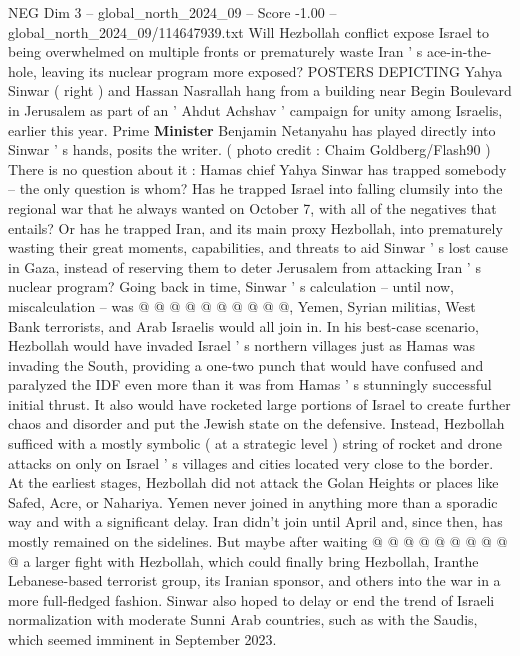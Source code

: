 \begin{textsample}{NEG Dim 3 – global\_north\_2024\_09 – Score -1.00 – global\_north\_2024\_09/114647939.txt}  \label{ex:f3_neg_299}
Will Hezbollah conflict expose Israel to being overwhelmed on multiple fronts or prematurely waste Iran ' s ace-in-the-hole, leaving its nuclear program more exposed?
POSTERS DEPICTING Yahya Sinwar ( right ) and Hassan Nasrallah hang from a building near Begin Boulevard in Jerusalem as part of an ' Ahdut Achshav ' campaign for unity among Israelis, earlier this year.
Prime \textbf{Minister} Benjamin Netanyahu has played directly into Sinwar ' s hands, posits the writer. ( photo credit : Chaim Goldberg/Flash90 ) There is no question about it : Hamas chief Yahya Sinwar has trapped somebody -- the only question is whom?
Has he trapped Israel into falling clumsily into the regional war that he always wanted on October 7, with all of the negatives that entails?
Or has he trapped Iran, and its main proxy Hezbollah, into prematurely wasting their great moments, capabilities, and threats to aid Sinwar ' s lost cause in Gaza, instead of reserving them to deter Jerusalem from attacking Iran ' s nuclear program?
Going back in time, Sinwar ' s calculation -- until now, miscalculation -- was @ @ @ @ @ @ @ @ @ @, Yemen, Syrian militias, West Bank terrorists, and Arab Israelis would all join in.
In his best-case scenario, Hezbollah would have invaded Israel ' s northern villages just as Hamas was invading the South, providing a one-two punch that would have confused and paralyzed the IDF even more than it was from Hamas ' s stunningly successful initial thrust.
It also would have rocketed large portions of Israel to create further chaos and disorder and put the Jewish state on the defensive.
Instead, Hezbollah sufficed with a mostly symbolic ( at a strategic level ) string of rocket and drone attacks on only on Israel ' s villages and cities located very close to the border.
At the earliest stages, Hezbollah did not attack the Golan Heights or places like Safed, Acre, or Nahariya.
Yemen never joined in anything more than a sporadic way and with a significant delay.
Iran didn't join until April and, since then, has mostly remained on the sidelines.
But maybe after waiting @ @ @ @ @ @ @ @ @ @ a larger fight with Hezbollah, which could finally bring Hezbollah, Iranthe Lebanese-based terrorist group, its Iranian sponsor, and others into the war in a more full-fledged fashion.
Sinwar also hoped to delay or end the trend of Israeli normalization with moderate Sunni Arab countries, such as with the Saudis, which seemed imminent in September 2023.

\end{textsample}
